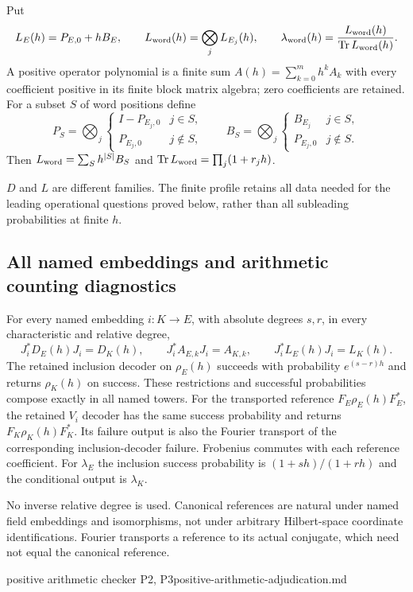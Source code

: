 \begin{definition}
Put
\[
 L_E(h)=P_{E,0}+hB_E,\qquad
 L_{\rm word}(h)=\bigotimes_jL_{E_j}(h),\qquad
 \lambda_{\rm word}(h)=\frac{L_{\rm word}(h)}{\operatorname{Tr}L_{\rm word}(h)}.
\]
A positive operator polynomial is a finite sum $A(h)=\sum_{k=0}^mh^kA_k$
with every coefficient positive in its finite block matrix algebra; zero
coefficients are retained. For a subset $S$ of word positions define
\[
 P_S=\bigotimes_j\begin{cases}I-P_{E_j,0}&j\in S,\\P_{E_j,0}&j\notin S,
 \end{cases}\qquad
 B_S=\bigotimes_j\begin{cases}B_{E_j}&j\in S,\\P_{E_j,0}&j\notin S.
 \end{cases}
\]
Then $L_{\rm word}=\sum_Sh^{|S|}B_S$ and
$\operatorname{Tr}L_{\rm word}=\prod_j(1+r_jh)$.
\end{definition}
\begin{scope}
$D$ and $L$ are different families. The finite profile retains all data
needed for the leading operational questions proved below, rather than
all subleading probabilities at finite $h$.
\end{scope}

\subsection{All named embeddings and arithmetic counting diagnostics}

\begin{proposition}
\statusProved\quad
For every named embedding $i:K\to E$, with absolute degrees $s,r$, in
every characteristic and relative degree,
\[
 J_i^*D_E(h)J_i=D_K(h),\qquad J_i^*A_{E,k}J_i=A_{K,k},\qquad
 J_i^*L_E(h)J_i=L_K(h).
\]
The retained inclusion decoder on $\rho_E(h)$ succeeds with probability
$e^{(s-r)h}$ and returns $\rho_K(h)$ on success. These restrictions and
successful probabilities compose exactly in all named towers.
For the transported reference $F_E\rho_E(h)F_E^*$, the retained $V_i$
decoder has the same success probability and returns
$F_K\rho_K(h)F_K^*$. Its failure output is also the Fourier transport of
the corresponding inclusion-decoder failure. Frobenius commutes with each
reference coefficient. For $\lambda_E$ the inclusion success probability
is $(1+sh)/(1+rh)$ and the conditional output is $\lambda_K$.
\end{proposition}
\begin{scope}
No inverse relative degree is used. Canonical references are natural under
named field embeddings and isomorphisms, not under arbitrary Hilbert-space
coordinate identifications. Fourier transports a reference to its actual
conjugate, which need not equal the canonical reference.
\end{scope}
{positive arithmetic checker P2, P3}{positive-arithmetic-adjudication.md}


